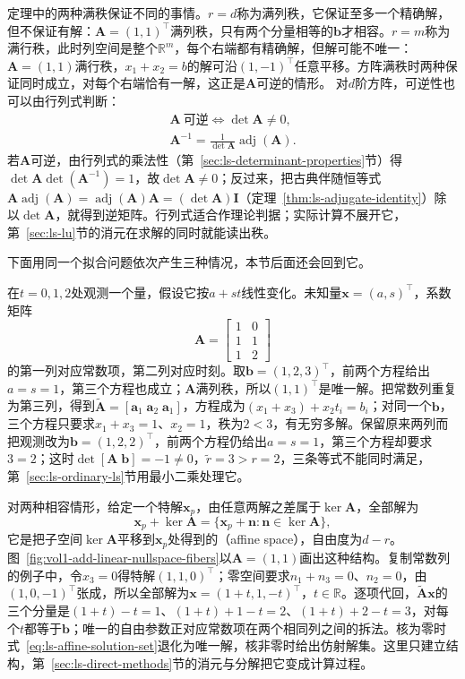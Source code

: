 定理中的两种满秩保证不同的事情。$r=d$称为满列秩，它保证至多一个精确解，但不保证有解：$\bm A=(1,1)^\top$满列秩，只有两个分量相等的$\bm b$才相容。$r=m$称为满行秩，此时列空间是整个$\mathbb R^m$，每个右端都有精确解，但解可能不唯一：$\bm A=(1,1)$满行秩，$x_1+x_2=b$的解可沿$(1,-1)^\top$任意平移。方阵满秩时两种保证同时成立，对每个右端恰有一解，这正是$\bm A$可逆的情形。
\label{sec:ls-determinant-invertibility}%
对$d$阶方阵，可逆性也可以由行列式判断：
\[
\begin{gathered}
\bm A\ \text{可逆}\iff\det\bm A\neq0,\\
\bm A^{-1}=\frac{1}{\det\bm A}\operatorname{adj}(\bm A).
\end{gathered}
\]
若$\bm A$可逆，由行列式的乘法性（第~\ref{sec:ls-determinant-properties}节）得$\det\bm A\det(\bm A^{-1})=1$，故$\det\bm A\neq0$；反过来，把古典伴随恒等式$\bm A\operatorname{adj}(\bm A)=\operatorname{adj}(\bm A)\bm A=(\det\bm A)\bm I$（定理~\ref{thm:ls-adjugate-identity}）除以$\det\bm A$，就得到逆矩阵。行列式适合作理论判据；实际计算不展开它，第~\ref{sec:ls-lu}节的消元在求解的同时就能读出秩。

下面用同一个拟合问题依次产生三种情况，本节后面还会回到它。

\begin{example}[直线观测中的三种情况]
\label{ex:ls-line-three-cases}
在$t=0,1,2$处观测一个量，假设它按$a+st$线性变化。未知量$\bm x=(a,s)^\top$，系数矩阵
\[
 \bm A=\begin{bmatrix}1&0\\1&1\\1&2\end{bmatrix}
\]
的第一列对应常数项，第二列对应时刻。取$\bm b=(1,2,3)^\top$，前两个方程给出$a=s=1$，第三个方程也成立；$\bm A$满列秩，所以$(1,1)^\top$是唯一解。把常数列重复为第三列，得到$\widetilde{\bm A}=[\bm a_1\;\bm a_2\;\bm a_1]$，方程成为$(x_1+x_3)+x_2t_i=b_i$；对同一个$\bm b$，三个方程只要求$x_1+x_3=1$、$x_2=1$，秩为$2<3$，有无穷多解。保留原来两列而把观测改为$\bm b=(1,2,2)^\top$，前两个方程仍给出$a=s=1$，第三个方程却要求$3=2$；这时$\det[\bm A\;\bm b]=-1\neq0$，$\tilde r=3>r=2$，三条等式不能同时满足，第~\ref{sec:ls-ordinary-ls}节用最小二乘处理它。
\end{example}

对两种相容情形，给定一个特解$\bm x_p$，由任意两解之差属于$\ker\bm A$，全部解为
\begin{equation}
 \bm x_p+\ker\bm A=\{\bm x_p+\bm n:\bm n\in\ker\bm A\},
 \label{eq:ls-affine-solution-set}
\end{equation}
它是把子空间$\ker\bm A$平移到$\bm x_p$处得到的（affine space），自由度为$d-r$。图~\ref{fig:vol1-add-linear-nullspace-fibers}以$\bm A=(1,1)$画出这种结构。复制常数列的例子中，令$x_3=0$得特解$(1,1,0)^\top$；零空间要求$n_1+n_3=0$、$n_2=0$，由$(1,0,-1)^\top$张成，所以全部解为$\bm x=(1+t,1,-t)^\top$，$t\in\mathbb R$。逐项代回，$\widetilde{\bm A}\bm x$的三个分量是$(1+t)-t=1$、$(1+t)+1-t=2$、$(1+t)+2-t=3$，对每个$t$都等于$\bm b$；唯一的自由参数正对应常数项在两个相同列之间的拆法。核为零时式~\eqref{eq:ls-affine-solution-set}退化为唯一解，核非零时给出仿射解集。这里只建立结构，第~\ref{sec:ls-direct-methods}节的消元与分解把它变成计算过程。

